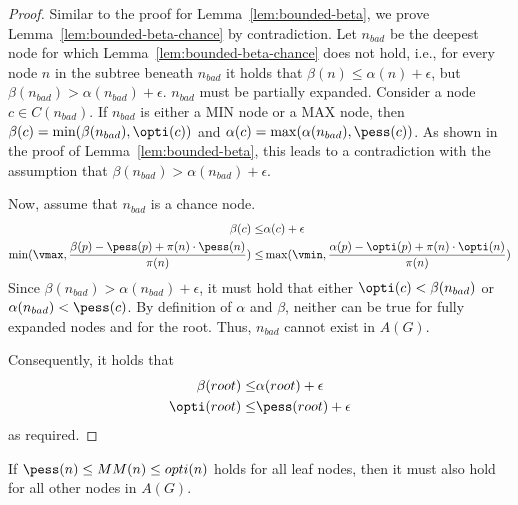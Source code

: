 \begin{proof} 
Similar to the proof for Lemma~\ref{lem:bounded-beta}, we prove Lemma~\ref{lem:bounded-beta-chance} by contradiction. Let 
$n_{bad}$ be the deepest node for which Lemma~\ref{lem:bounded-beta-chance} does not hold, i.e., for every node $n$  in the subtree beneath $n_{bad}$ it holds that 
$\beta(n)\leq \alpha(n)+\epsilon$, 
but $\beta(n_{bad})>\alpha(n_{bad})+\epsilon$. 
$n_{bad}$ must be partially expanded. Consider a node $c\in C(n_{bad})$. 
If $n_{bad}$ is either a MIN node or a MAX node, then
$\beta(c)=\min(\beta(n_{bad}), \opti(c))$
and 
$\alpha(c)=\max(\alpha(n_{bad}), \pess(c))$. 
As shown in the proof of Lemma~\ref{lem:bounded-beta}, this leads to a contradiction with the assumption that $\beta(n_{bad})>\alpha(n_{bad})+\epsilon$. 

Now, assume that $n_{bad}$ is a chance node. 
\begin{align}
\beta(c) \leq & \alpha(c)+\epsilon \\
\min(\vmax, \frac{\beta(p)-\pess(p)+\pi(n)\cdot\pess(n)}{\pi(n)}) \leq & 
\max(\vmin, \frac{\alpha(p)-\opti(p)+\pi(n)\cdot\opti(n)}{\pi(n)}) 
\end{align}
Since $\beta(n_{bad})>\alpha(n_{bad})+\epsilon$, 
it must hold that either $\opti(c)<\beta(n_{bad})$
or $\alpha(n_{bad})<\pess(c)$. 
By definition of $\alpha$ and $\beta$, neither can be true for fully expanded nodes
and for the root. Thus, $n_{bad}$ cannot exist in $A(G)$. 

Consequently, it holds that 
\begin{align}
\beta(root)\leq & \alpha(root)+\epsilon\\
\opti(root) \leq & \pess(root)+\epsilon 
\end{align}
as required.
\end{proof}
\begin{lemma}
If $\pess(n)\leq MM(n)\leq opti(n)$ holds for all leaf nodes, then it must also hold for all other nodes in $A(G)$. 
\label{lem:opti-pess}
\end{lemma}

